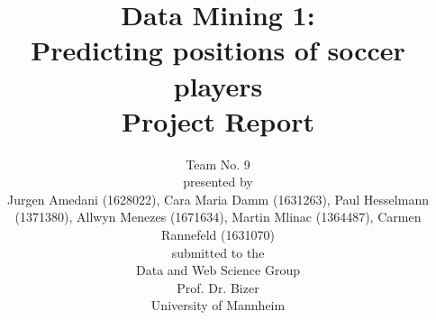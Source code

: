 \documentclass[runningheads]{llncs}
\begin{document}
%
\title{Data Mining 1: \\
Predicting positions of soccer players  \\
Project Report}

\vspace{2cm}
\author{Team No. 9\\
\vspace{1cm}
presented by\\
Jurgen Amedani (1628022), Cara Maria Damm (1631263), Paul Hesselmann (1371380), Allwyn Menezes (1671634), Martin Mlinac (1364487), Carmen Rannefeld (1631070)\\
\vspace{1cm}
submitted to the \\
Data and Web Science Group\\
Prof. Dr. Bizer\\
University of Mannheim}

\institute{}
\maketitle              %
\newpage




\newpage









%
%
\end{document}
